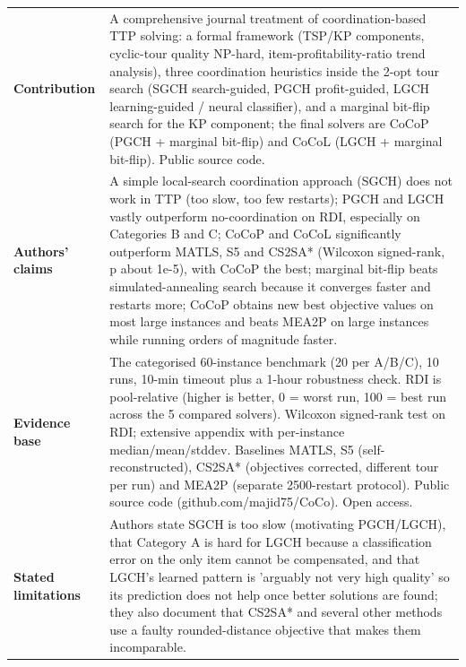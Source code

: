 \documentclass[
  a4paper,
  11pt,
  headings=small,
  numbers=noenddot,
  abstract=on,
  parskip=half,
]{scrartcl}
\begin{document}
\begin{landscape}
\begin{longtable}{@{}p{2.6cm}p{8.7cm}p{2.6cm}p{8.7cm}@{}}
\textbf{Contribution} & \multicolumn{3}{p{20.0cm}}{A comprehensive journal treatment of coordination-based TTP solving: a formal framework (TSP/KP components, cyclic-tour quality NP-hard, item-profitability-ratio trend analysis), three coordination heuristics inside the 2-opt tour search (SGCH search-guided, PGCH profit-guided, LGCH learning-guided / neural classifier), and a marginal bit-flip search for the KP component; the final solvers are CoCoP (PGCH + marginal bit-flip) and CoCoL (LGCH + marginal bit-flip). Public source code.} \\
\textbf{Authors' claims} & \multicolumn{3}{p{20.0cm}}{A simple local-search coordination approach (SGCH) does not work in TTP (too slow, too few restarts); PGCH and LGCH vastly outperform no-coordination on RDI, especially on Categories B and C; CoCoP and CoCoL significantly outperform MATLS, S5 and CS2SA* (Wilcoxon signed-rank, p about 1e-5), with CoCoP the best; marginal bit-flip beats simulated-annealing search because it converges faster and restarts more; CoCoP obtains new best objective values on most large instances and beats MEA2P on large instances while running orders of magnitude faster.} \\
\textbf{Evidence base} & \multicolumn{3}{p{20.0cm}}{The categorised 60-instance benchmark (20 per A/B/C), 10 runs, 10-min timeout plus a 1-hour robustness check. RDI is pool-relative (higher is better, 0 = worst run, 100 = best run across the 5 compared solvers). Wilcoxon signed-rank test on RDI; extensive appendix with per-instance median/mean/stddev. Baselines MATLS, S5 (self-reconstructed), CS2SA* (objectives corrected, different tour per run) and MEA2P (separate 2500-restart protocol). Public source code (github.com/majid75/CoCo). Open access.} \\
\textbf{Stated limitations} & \multicolumn{3}{p{20.0cm}}{Authors state SGCH is too slow (motivating PGCH/LGCH), that Category A is hard for LGCH because a classification error on the only item cannot be compensated, and that LGCH's learned pattern is 'arguably not very high quality' so its prediction does not help once better solutions are found; they also document that CS2SA* and several other methods use a faulty rounded-distance objective that makes them incomparable.} \\

\end{longtable}
\end{landscape}
\end{document}
